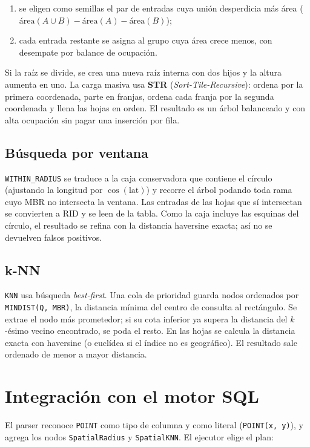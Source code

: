 \documentclass[11pt,a4paper]{article}
\newcommand{\code}[1]{\texttt{#1}}
\begin{document}
\begin{enumerate}
  \item se eligen como semillas el par de entradas cuya unión desperdicia más
        área (\(\text{área}(A \cup B) - \text{área}(A) - \text{área}(B)\));
  \item cada entrada restante se asigna al grupo cuya área crece menos, con
        desempate por balance de ocupación.
\end{enumerate}

Si la raíz se divide, se crea una nueva raíz interna con dos hijos y la altura
aumenta en uno. La carga masiva usa \textbf{STR} (\emph{Sort-Tile-Recursive}):
ordena por la primera coordenada, parte en franjas, ordena cada franja por la
segunda coordenada y llena las hojas en orden. El resultado es un árbol
balanceado y con alta ocupación sin pagar una inserción por fila.

\subsection{Búsqueda por ventana}

\code{WITHIN\_RADIUS} se traduce a la caja conservadora que contiene el círculo
(ajustando la longitud por \(\cos(\text{lat})\)) y recorre el árbol podando toda
rama cuyo MBR no intersecta la ventana. Las entradas de las hojas que sí
intersectan se convierten a RID y se leen de la tabla. Como la caja incluye las
esquinas del círculo, el resultado se refina con la distancia haversine exacta;
así no se devuelven falsos positivos.

\subsection{k-NN}

\code{KNN} usa búsqueda \emph{best-first}. Una cola de prioridad guarda nodos
ordenados por \code{MINDIST(Q, MBR)}, la distancia mínima del centro de consulta
al rectángulo. Se extrae el nodo más prometedor; si su cota inferior ya supera la
distancia del \(k\)-ésimo vecino encontrado, se poda el resto. En las hojas se
calcula la distancia exacta con haversine (o euclídea si el índice no es
geográfico). El resultado sale ordenado de menor a mayor distancia.

\section{Integración con el motor SQL}

El parser reconoce \code{POINT} como tipo de columna y como literal
(\code{POINT(x, y)}), y agrega los nodos \code{SpatialRadius} y \code{SpatialKNN}.
El ejecutor elige el plan:
\end{document}
